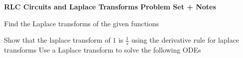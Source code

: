 \documentclass{exam}
\begin{document}
    \vspace*{-25px}
    \begin{center}
        \huge \textbf{RLC Circuits and Laplace Transforms Problem Set + Notes}
    \end{center}
    \vspace*{0.05in}
    
    \begin{questions}
        \large
        \question Find the Laplace transforms of the given functions
        \question Show that the laplace transform of $1$ is $\frac{1}{s}$ using the derivative rule for laplace transforms 
        \question Use a Laplace transform to solve the following ODEs
\end{questions}
\end{document}
